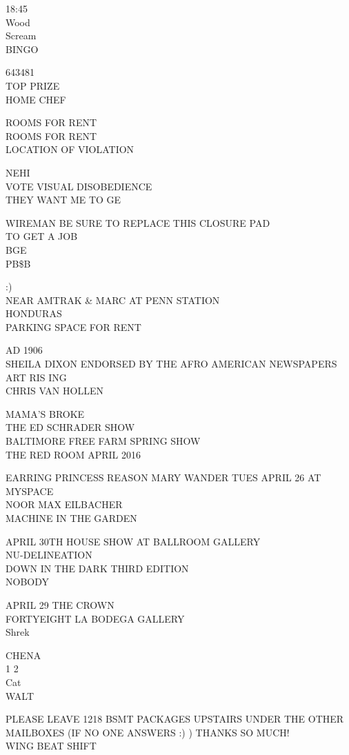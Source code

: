 \documentclass[10pt,letterpaper]{article}
\begin{document}
18:45\\
Wood\\
Scream\\
BINGO

643481\\
TOP PRIZE\\
HOME CHEF

ROOMS FOR RENT\\
ROOMS FOR RENT\\
LOCATION OF VIOLATION

NEHI\\
VOTE VISUAL DISOBEDIENCE\\
THEY WANT ME TO GE

WIREMAN BE SURE TO REPLACE THIS CLOSURE PAD\\
TO GET A JOB\\
BGE\\
PB\$B

:)\\
NEAR AMTRAK \& MARC AT PENN STATION\\
HONDURAS\\
PARKING SPACE FOR RENT

AD 1906\\
SHEILA DIXON ENDORSED BY THE AFRO AMERICAN NEWSPAPERS\\
ART RIS ING\\
CHRIS VAN HOLLEN

MAMA'S BROKE\\
THE ED SCHRADER SHOW\\
BALTIMORE FREE FARM SPRING SHOW\\
THE RED ROOM APRIL 2016

EARRING PRINCESS REASON MARY WANDER TUES APRIL 26 AT MYSPACE\\
NOOR MAX EILBACHER\\
MACHINE IN THE GARDEN

APRIL 30TH HOUSE SHOW AT BALLROOM GALLERY\\
NU{-}DELINEATION\\
DOWN IN THE DARK THIRD EDITION\\
NOBODY

APRIL 29 THE CROWN\\
FORTYEIGHT LA BODEGA GALLERY\\
Shrek

CHENA\\
1 2\\
Cat\\
WALT

PLEASE LEAVE 1218 BSMT PACKAGES UPSTAIRS UNDER THE OTHER MAILBOXES (IF NO ONE ANSWERS :) )  THANKS SO MUCH!\\
WING BEAT SHIFT
\end{document}
